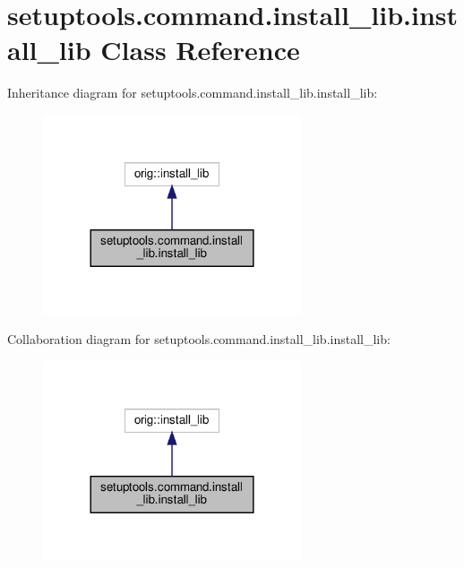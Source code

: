 \hypertarget{classsetuptools_1_1command_1_1install__lib_1_1install__lib}{}\section{setuptools.\+command.\+install\+\_\+lib.\+install\+\_\+lib Class Reference}
\label{classsetuptools_1_1command_1_1install__lib_1_1install__lib}


Inheritance diagram for setuptools.\+command.\+install\+\_\+lib.\+install\+\_\+lib\+:
\nopagebreak
\begin{figure}[H]
\begin{center}
\leavevmode
\includegraphics[width=216pt]{classsetuptools_1_1command_1_1install__lib_1_1install__lib__inherit__graph}
\end{center}
\end{figure}


Collaboration diagram for setuptools.\+command.\+install\+\_\+lib.\+install\+\_\+lib\+:
\nopagebreak
\begin{figure}[H]
\begin{center}
\leavevmode
\includegraphics[width=216pt]{classsetuptools_1_1command_1_1install__lib_1_1install__lib__coll__graph}
\end{center}
\end{figure}

